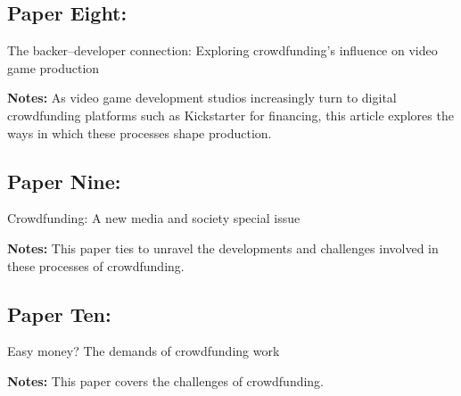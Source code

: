 \documentclass{scrartcl}
\begin{document}
\subsection{Paper Eight:}
The backer–developer connection: Exploring crowdfunding's influence on video game production
\cite{smith2014}

\textbf{Notes:}
As video game development studios increasingly turn to digital crowdfunding platforms such as Kickstarter for financing, this article explores the ways in which these processes shape production.

\subsection{Paper Nine:}
Crowdfunding: A new media and society special issue
\cite{bennett2014}

\textbf{Notes:}
This paper ties to unravel the developments and challenges involved in these processes of crowdfunding.

\subsection{Paper Ten:}
Easy money? The demands of crowdfunding work
\cite{hui2012}

\textbf{Notes:}
This paper covers the challenges of crowdfunding.




\end{document}
